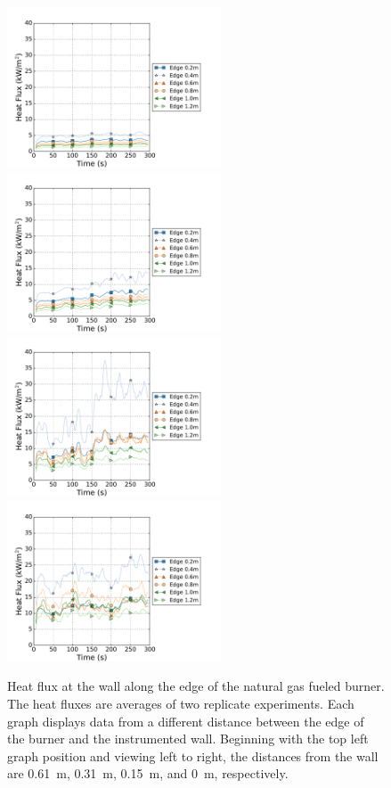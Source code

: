 \documentclass[twoside]{uocthesis}
\begin{document}
{\begin{figure}[ht!]
	\centering
	\includegraphics[width=2.5in]{../Figures/TWNG01_HF_Offset_Avg}
	\includegraphics[width=2.5in]{../Figures/TWNG03_HF_Offset_Avg}\\
	\includegraphics[width=2.5in]{../Figures/TWNG05_HF_Offset_Avg}
	\includegraphics[width=2.5in]{../Figures/TWNG07_HF_Offset_Avg}\\
	\caption[Heat flux at the wall along the edge of the natural gas fueled burner]{Heat flux at the wall along the edge of the natural gas fueled burner. The heat fluxes are averages of two replicate experiments. Each graph displays data from a different distance between the edge of the burner and the instrumented wall. Beginning with the top left graph position and viewing left to right, the distances from the wall are 0.61~m, 0.31~m, 0.15~m, and 0~m, respectively.}
	\label{HF_Edge_TWNG_comp}
\end{figure}

}
\end{document}
